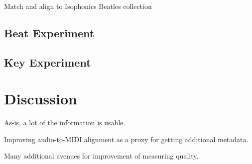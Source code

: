 \documentclass{article}
\begin{document}
Match and align to Isophonics Beatles collection

\subsection{Beat Experiment}

\subsection{Key Experiment}

\section{Discussion}
\label{sec:discussion}

As-is, a lot of the information is usable.

Improving audio-to-MIDI alignment as a proxy for getting additional metadata.

Many additional avenues for improvement of measuring quality.


\end{document}
